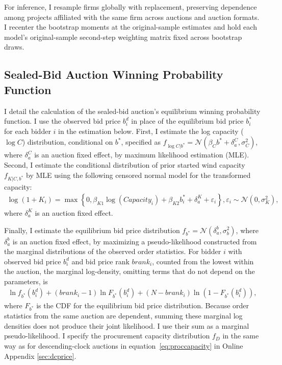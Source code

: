 \documentclass[12pt]{article}
\theoremstyle{definition} %
\begin{document}
For inference, I resample firms globally with replacement, preserving dependence among projects affiliated with the same firm across auctions and auction formats. I recenter the bootstrap moments at the original-sample estimates and hold each model's original-sample second-step weighting matrix fixed across bootstrap draws.


\subsection{Sealed-Bid Auction Winning Probability Function}
\label{sec:winprob}

I detail the calculation of the sealed-bid auction's equilibrium winning probability function. I use the observed bid price $b_i^d $ in place of the equilibrium bid price $b_i^\ast$ for each bidder $i $ in the estimation below. First, I estimate the log capacity ($\log C$) distribution, conditional on $b^\ast$, specified as $f_{\log C | b^\ast} = \mathcal{N}(\beta_C b^\ast + \delta^C_a,\sigma_C^2)$, where $\delta^C_a $ is an auction fixed effect, by maximum likelihood estimation (MLE). Second, I estimate the conditional distribution of prior started wind capacity $f_{K|C,b^\ast}$ by MLE using the following censored normal model for the transformed capacity:
\begin{align*}
\log(1+K_i)
= \max\left\{0,\beta_{K 1}\log(Capacity_i)+\beta_{K 2}b_i^\ast
+\delta^K_a+\varepsilon_i\right\},
\varepsilon_i\sim\mathcal{N}(0,\sigma_K^2),
\end{align*}
where $\delta^K_a $ is an auction fixed effect.

Finally, I estimate the equilibrium bid price distribution $f_{b^\ast} = \mathcal{N}(\delta^b_a,\sigma_b^2)$, where $\delta^b_a $ is an auction fixed effect, by maximizing a pseudo-likelihood constructed from the marginal distributions of the observed order statistics. For bidder $i$ with observed bid price $b_i^d $ and bid price rank $brank_i $, counted from the lowest within the auction, the marginal log-density, omitting terms that do not depend on the parameters, is
\begin{align*}
\ln f_{b^\ast}(b_i^d) + (brank_i-1) \ln F_{b^\ast}(b_i^d) + (N-brank_i) \ln (1-F_{b^\ast}(b_i^d)),
\end{align*}
where $F_{b^\ast} $ is the CDF for the equilibrium bid price distribution. Because order statistics from the same auction are dependent, summing these marginal log densities does not produce their joint likelihood. I use their sum as a marginal pseudo-likelihood. I specify the procurement capacity distribution $f_D$ in the same way as for descending-clock auctions in equation~\eqref{eq:proccapacity} in Online Appendix \ref{sec:dcprice}.
\end{document}
